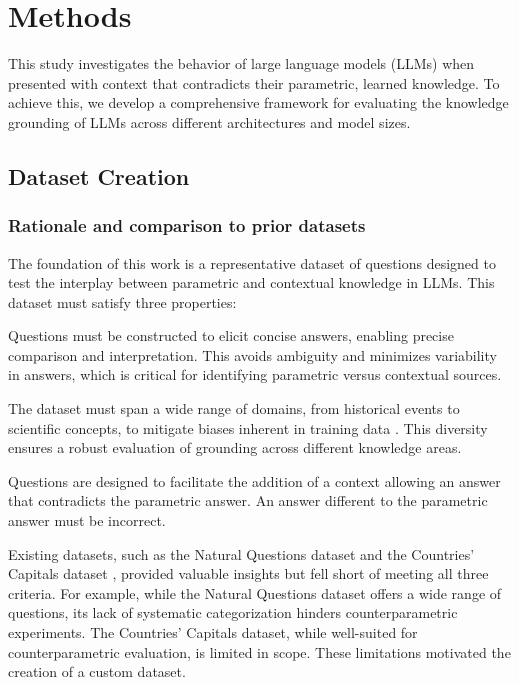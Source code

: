 \section{Methods}
\label{methodology_section}


This study investigates the behavior of large language models (LLMs) when presented with context that contradicts their parametric, learned knowledge.
To achieve this, we develop a comprehensive framework for evaluating the knowledge grounding of LLMs across different architectures and model sizes.

\subsection{Dataset Creation}
\label{dataset_creation}

\subsubsection{Rationale and comparison to prior datasets}

The foundation of this work is a representative dataset of questions designed to test the interplay between parametric and contextual knowledge in LLMs.
This dataset must satisfy three properties:
\begin{description}[style=nextline]
	\item[1. Short, unambiguous answers] Questions must be constructed to elicit concise answers, enabling precise comparison and interpretation.
This avoids ambiguity and minimizes variability in answers, which is critical for identifying parametric versus contextual sources.
	\item[2. Coverage of diverse topics] The dataset must span a wide range of domains, from historical events to scientific concepts, to mitigate biases inherent in training data \cite{wikipedia_geographic_bias}.
	This diversity ensures a robust evaluation of grounding across different knowledge areas.
	\item[3. Conterparametric compatibility] Questions are designed to facilitate the addition of a context allowing an answer that contradicts the parametric answer.
		An answer different to the parametric answer must be incorrect.
\end{description}

Existing datasets, such as the Natural Questions dataset \cite{natural_questions} and the Countries' Capitals dataset \cite{factual_recall}, provided valuable insights but fell short of meeting all three criteria.
For example, while the Natural Questions dataset offers a wide range of questions, its lack of systematic categorization hinders counterparametric experiments.
The Countries' Capitals dataset, while well-suited for counterparametric evaluation, is limited in scope.
These limitations motivated the creation of a custom dataset.

